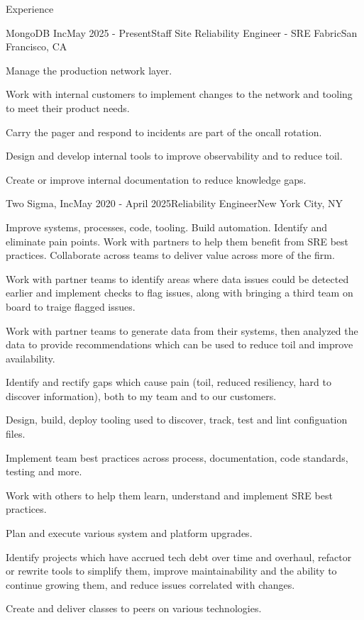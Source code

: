\documentclass{resume}
\begin{document}
  \begin{rSection}{Experience}
    \begin{rSubsection}{MongoDB Inc}{May 2025 - Present}{Staff Site Reliability Engineer - SRE Fabric}{San Francisco, CA}
      \item Manage the production network layer.
      \item Work with internal customers to implement changes to the network and tooling to meet their product needs.
      \item Carry the pager and respond to incidents are part of the oncall rotation.
      \item Design and develop internal tools to improve observability and to reduce toil.
      \item Create or improve internal documentation to reduce knowledge gaps.
    \end{rSubsection}

    \begin{rSubsection}{Two Sigma, Inc}{May 2020 - April 2025}{Reliability Engineer}{New York City, NY}
      \item Improve systems, processes, code, tooling. Build automation. Identify and eliminate pain points. Work with partners to help them benefit from SRE best practices. Collaborate across teams to deliver value across more of the firm.
      \item Work with partner teams to identify areas where data issues could be detected earlier and implement checks to flag issues, along with bringing a third team on board to traige flagged issues.
      \item Work with partner teams to generate data from their systems, then analyzed the data to provide recommendations which can be used to reduce toil and improve availability.
      \item Identify and rectify gaps which cause pain (toil, reduced resiliency, hard to discover information), both to my team and to our customers.
      \item Design, build, deploy tooling used to discover, track, test and lint configuation files.
      \item Implement team best practices across process, documentation, code standards, testing and more.
      \item Work with others to help them learn, understand and implement SRE best practices.
      \item Plan and execute various system and platform upgrades.
      \item Identify projects which have accrued tech debt over time and overhaul, refactor or rewrite tools to simplify them, improve maintainability and the ability to continue growing them, and reduce issues correlated with changes.
      \item Create and deliver classes to peers on various technologies.
    \end{rSubsection}


\end{rSection}
\end{document}
